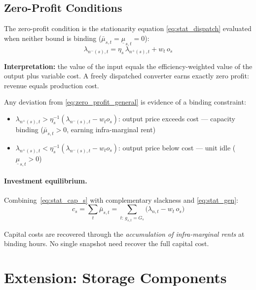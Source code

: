 \documentclass{article}
\begin{document}
\subsection{Zero-Profit Conditions}
\label{sec:zero_profit}

The zero-profit condition is the stationarity equation
\eqref{eq:stat_dispatch} evaluated when neither bound is binding
($\bar{\mu}_{s,t} = \underline{\mu}_{s,t} = 0$):
\begin{equation}
    \lambda_{n^-(s),t} = \eta_s\, \lambda_{n^+(s),t} + w_t\, o_s
    \label{eq:zero_profit_general}
\end{equation}

\textbf{Interpretation:} the value of the input equals the efficiency-weighted
value of the output plus variable cost. A freely dispatched converter earns
exactly zero profit: revenue equals production cost.

Any deviation from \eqref{eq:zero_profit_general} is evidence of a binding
constraint:
\begin{itemize}
    \item $\lambda_{n^+(s),t} > \eta_s^{-1}(\lambda_{n^-(s),t} - w_t o_s)$:
          output price exceeds cost --- capacity binding
          ($\bar{\mu}_{s,t} > 0$, earning infra-marginal rent)
    \item $\lambda_{n^+(s),t} < \eta_s^{-1}(\lambda_{n^-(s),t} - w_t o_s)$:
          output price below cost --- unit idle
          ($\underline{\mu}_{s,t} > 0$)
\end{itemize}

\paragraph{Investment equilibrium.}
Combining~\eqref{eq:stat_cap_s} with complementary slackness and
\eqref{eq:stat_gen}:
\begin{equation}
    c_s = \sum_t \bar{\mu}_{s,t}
        = \sum_{t:\, g_{s,t} = G_s} \bigl(\lambda_{n,t} - w_t\, o_s\bigr)
    \label{eq:investment_eq}
\end{equation}

Capital costs are recovered through the \emph{accumulation of infra-marginal
rents} at binding hours. No single snapshot need recover the full capital cost.

\section{Extension: Storage Components}
\label{sec:storage_extension}
\end{document}
